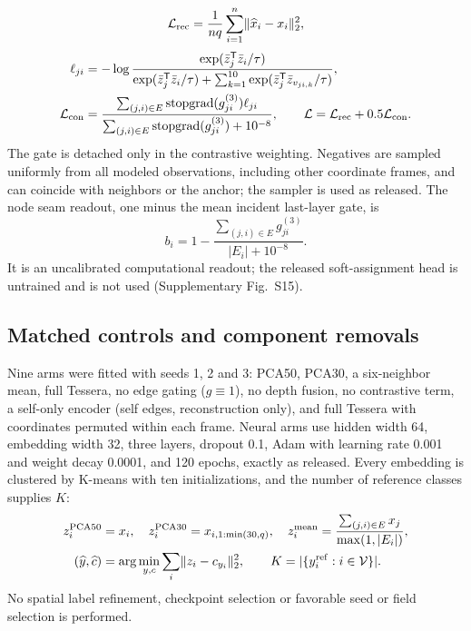 \documentclass[11pt]{article}
\begin{document}
\begin{equation}
\mathcal L_{\rm rec}=\frac{1}{nq}\sum_{i=1}^n\lVert\widehat x_i-x_i\rVert_2^2,\label{eq:reconstruction}
\end{equation}
\begin{align}
\ell_{ji}&=-\log\frac{\exp(\bar z_j^{\mathsf T}\bar z_i/\tau)}{\exp(\bar z_j^{\mathsf T}\bar z_i/\tau)+\sum_{k=1}^{10}\exp(\bar z_j^{\mathsf T}\bar z_{v_{ji,k}}/\tau)},\label{eq:contrast}\\
\mathcal L_{\rm con}&=\frac{\sum_{(j,i)\in E}\operatorname{stopgrad}(g_{ji}^{(3)})\ell_{ji}}{\sum_{(j,i)\in E}\operatorname{stopgrad}(g_{ji}^{(3)})+10^{-8}},\qquad
\mathcal L=\mathcal L_{\rm rec}+0.5\mathcal L_{\rm con}.\label{eq:loss}
\end{align}
The gate is detached only in the contrastive weighting. Negatives are sampled uniformly from all modeled observations, including other coordinate frames, and can coincide with neighbors or the anchor; the sampler is used as released. The node seam readout, one minus the mean incident last-layer gate, is
\begin{equation}
b_i=1-\frac{\sum_{(j,i)\in E}g_{ji}^{(3)}}{|E_i|+10^{-8}}.\label{eq:seam}
\end{equation}
It is an uncalibrated computational readout; the released soft-assignment head is untrained and is not used (Supplementary Fig.~S15).



\subsection{Matched controls and component removals}
Nine arms were fitted with seeds 1, 2 and 3: PCA50, PCA30, a six-neighbor mean, full Tessera, no edge gating (\(g\equiv1\)), no depth fusion, no contrastive term, a self-only encoder (self edges, reconstruction only), and full Tessera with coordinates permuted within each frame. Neural arms use hidden width 64, embedding width 32, three layers, dropout 0.1, Adam with learning rate 0.001 and weight decay 0.0001, and 120 epochs, exactly as released. Every embedding is clustered by K-means with ten initializations, and the number of reference classes supplies \(K\):
\begin{align}
z_i^{\rm PCA50}&=x_i,\quad z_i^{\rm PCA30}=x_{i,1:\min(30,q)},\quad
z_i^{\rm mean}=\frac{\sum_{(j,i)\in E}x_j}{\max(1,|E_i|)},\label{eq:controls}\\
(\widehat y,\widehat c)&=\arg\min_{y,c}\sum_i\lVert z_i-c_{y_i}\rVert_2^2,
\qquad K=|\{y_i^{\rm ref}:i\in\mathcal V\}|.\label{eq:kmeans}
\end{align}
No spatial label refinement, checkpoint selection or favorable seed or field selection is performed.
\end{document}

